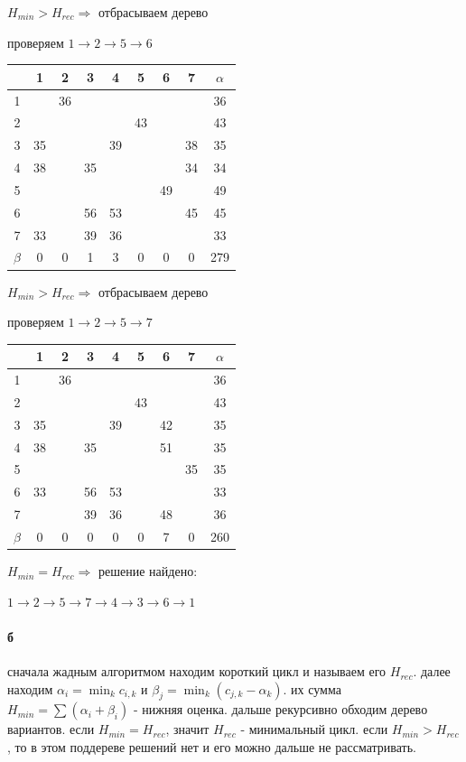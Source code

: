 \documentclass[russian]{article}
\begin{document}
$H_{min} > H_{rec} \Rightarrow $ отбрасываем дерево

проверяем 
$1 \to 2 \to 5 \to 6$

\begin{tabular}{|c|c|c|c|c|c|c|c|c|}\hline
& 1& 2& 3& 4& 5& 6& 7& $\alpha$\\\hline
1& & 36& & & & & & 36\\\hline
2& & & & & 43& & & 43\\\hline
3& 35& & & 39& & & 38& 35\\\hline
4& 38& & 35& & & & 34& 34\\\hline
5& & & & & & 49& & 49\\\hline
6& & & 56& 53& & & 45& 45\\\hline
7& 33& & 39& 36& & & & 33\\\hline
$\beta$& 0& 0& 1& 3& 0& 0& 0& 279\\\hline
\end{tabular}

$H_{min} > H_{rec} \Rightarrow $ отбрасываем дерево

проверяем 
$1 \to 2 \to 5 \to 7$

\begin{tabular}{|c|c|c|c|c|c|c|c|c|}\hline
& 1& 2& 3& 4& 5& 6& 7& $\alpha$\\\hline
1& & 36& & & & & & 36\\\hline
2& & & & & 43& & & 43\\\hline
3& 35& & & 39& & 42& & 35\\\hline
4& 38& & 35& & & 51& & 35\\\hline
5& & & & & & & 35& 35\\\hline
6& 33& & 56& 53& & & & 33\\\hline
7& & & 39& 36& & 48& & 36\\\hline
$\beta$& 0& 0& 0& 0& 0& 7& 0& 260\\\hline
\end{tabular}

$H_{min} = H_{rec} \Rightarrow $ решение найдено:

$1 \to 2 \to 5 \to 7 \to 4 \to 3 \to 6 \to 1$

\paragraph*{б}

сначала жадным алгоритмом находим короткий цикл и называем его $H_{rec}$. далее находим $\alpha_i = \min_k c_{i,k}$ и $\beta_j=\min_k(c_{j,k}-\alpha_k)$. их сумма $H_{min}=\sum(\alpha_i+\beta_i)$ - нижняя оценка.
дальше рекурсивно обходим дерево вариантов. если $H_{min}=H_{rec}$, значит $H_{rec}$ - минимальный цикл. если $H_{min}>H_{rec}$, то в этом поддереве решений нет и его можно дальше не рассматривать.
\end{document}
